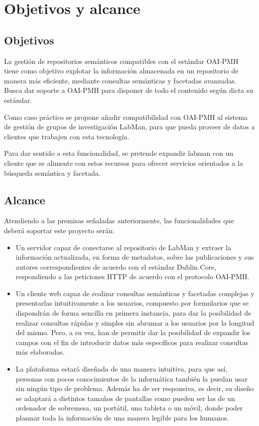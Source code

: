 \chapter{Objetivos y alcance}

\section{Objetivos}

La gestión de repositorios semánticos compatibles con el estándar OAI-PMH tiene como objetivo explotar la información almacenada en un repositorio de manera más eficiente, mediante consultas semánticas y facetadas avanzadas. Busca dar soporte a OAI-PMH para disponer de todo el contenido según dicta su estándar.

Como caso práctico se propone añadir compatibilidad con OAI-PMH al sistema de gestión de grupos de investigación LabMan, para que pueda proveer de datos a clientes que trabajen con esta tecnología.

Para dar sentido a esta funcionalidad, se pretende expandir labman con un cliente que se alimente con estos recursos para ofrecer servicios orientados a la búsqueda semántica y facetada.


\section{Alcance}

Atendiendo a las premisas señaladas anteriormente, las funcionalidades que deberá soportar este proyecto serán:

\begin{itemize}
	\item Un servidor capaz de conectarse al repositorio de LabMan y extraer la información actualizada, en forma de metadatos, sobre las publicaciones y sus autores correspondientes de acuerdo con el estándar Dublin Core, respondiendo a las peticiones HTTP de acuerdo con el protocolo OAI-PMH.
	
	\item Un cliente web capaz de realizar consultas semánticas y facetadas complejas y presentarlas intuitivamente a los usuarios, compuesto por formularios que se dispondrán de forma sencilla en primera instancia, para dar la posibilidad de realizar consultas rápidas y simples sin abrumar a los usuarios por la longitud del mismo. Pero, a su vez, han de permitir dar la posibilidad de expandir los campos con el fin de introducir datos más específicos para realizar consultas más elaboradas.

	\item La plataforma estará diseñada de una manera intuitiva, para que así, personas con pocos conocimientos de la informática también la puedan usar sin ningún tipo de problema. Además ha de ser responsiva, es decir, su diseño se adaptará a distintos tamaños de pantallas como pueden ser las de un ordenador de sobremesa, un portátil, una tableta o un móvil, donde poder plasmar toda la información de una manera legible para los humanos.
\end{itemize}

